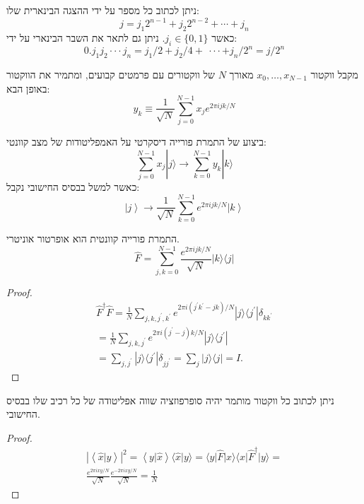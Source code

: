 \documentclass{tstextbook}
\begin{document}
\begin{definition}
ניתן לכתוב כל מספר על ידי ההצגה הבינארית שלו:
$$j=j_{1}2^{n-1}+j_{2}2^{n-2}+\cdots+j_{n}$$
כאשר \(j_{i} \in \{ 0,1 \}\). ניתן גם לתאר את השבר הבינארי על ידי:
$$0.j_{1}j_{2}\cdot\cdot\cdot j_{n}=j_{1}/2+j_{2}/4+\ \cdot\cdot\cdot+j_{n}/2^{n}=j/2^{n}$$

\end{definition}
\begin{definition}
מקבל ווקטור \(x_{0},\dots,x_{N-1}\) מאורך \(N\) של ווקטורים עם פרמטים קבועים, ומתמיר את הווקטור באופן הבא:
$$y_{k}\equiv\frac{1}{\sqrt{N}}\sum_{j=0}^{N-1}x_{j}e^{2\pi i j k/N}$$

\end{definition}
\begin{definition}
ביצוע של התמרת פורייה דיסקרטי על האמפליטודות של מצב קוונטי:
$$\sum_{j=0}^{N-1}x_{j}|j\rangle\longrightarrow\sum_{k=0}^{N-1}y_{k}|k\rangle$$
כאשר למשל בבסיס החישובי נקבל:
$$\left|j\right\rangle\longrightarrow\frac{1}{\sqrt{N}}\sum_{k=0}^{N-1}e^{2\pi i j k/N}\left|k\right\rangle$$

\end{definition}
\begin{proposition}
התמרת פורייה קוונטית הוא אופרטור אוניטרי.
$$\hat{F}=\sum_{j,k=0}^{N-1}\frac{e^{2\pi i j k/N}}{\sqrt{N}}|k\rangle\langle j|$$

\end{proposition}
\begin{proof}
\begin{gather*}{{\hat{F}^{\dagger}\hat{F}}}={{\frac{1}{N}\sum_{j,k,j^{\prime},k^{\prime}}e^{2\pi i(j^{\prime}k^{\prime}-j k)/N}|j\rangle\langle j^{\prime}|\delta_{k k^{\prime}}}}\\ ={{\frac{1}{N}\sum_{j,k,j^{\prime}}e^{2\pi i(j^{\prime}-j)k/N}|j\rangle\langle j^{\prime}|}}\\ ={{\sum_{j,j^{\prime}}|j\rangle\langle j^{\prime}|\delta_{j j^{\prime}}=\sum_{j}|j\rangle\langle j|=\hat{I}.}} 
\end{gather*}

\end{proof}
\begin{proposition}
ניתן לכתוב כל ווקטור מותמר יהיה סופרפוזציה שווה אפליטודה של כל רכיב שלו בבסיס החישובי.

\end{proposition}
\begin{proof}
\begin{gather*}{|\!\left\langle \hat{x}|y \right\rangle|^{2}}={{\left\langle  y|\hat{x} \right\rangle\langle \hat{x}|y \rangle=\langle  y|\hat{F}|x \rangle\langle  x|\hat{F}^{\dagger}|y \rangle}} = \\\frac{e^{ 2\pi ixy/ N }}{\sqrt{ N }}\frac{e^{ -2\pi ixy/ N }}{\sqrt{ N }}=\frac{1}{N}
\end{gather*}

\end{proof}
\end{document}

